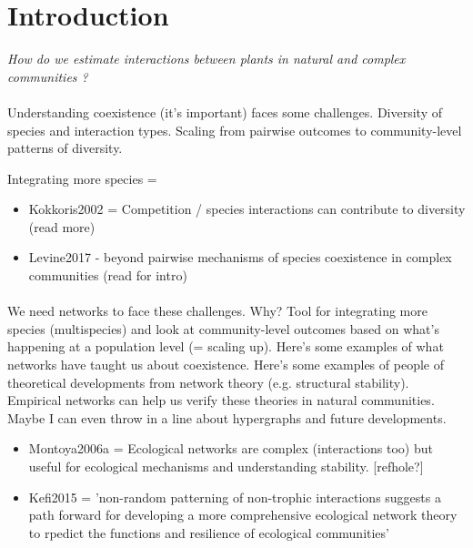 \documentclass[a4,12pt]{article}
\begin{document}
    


    \section{Introduction}

    \textit{How do we estimate interactions between plants in natural and complex communities ?}
 
    \paragraph{}
    Understanding coexistence (it's important) faces some challenges. Diversity of species and interaction types. Scaling from pairwise outcomes to community-level patterns of diversity.
    
    Integrating more species = 
    \begin{itemize}
        \item Kokkoris2002 =  Competition / species interactions can contribute to diversity (read more)
        \item Levine2017 - beyond pairwise mechanisms of species coexistence in complex communities (read for intro)
    \end{itemize}

    \paragraph{}
    We need networks to face these challenges. Why? Tool for integrating more species (multispecies) and look at community-level outcomes based on what's happening at a population level (= scaling up). Here's some examples of what networks have taught us about coexistence. Here's some examples of people of theoretical developments from network theory (e.g. structural stability). Empirical networks can help us verify these theories in natural communities. Maybe I can even throw in a line about hypergraphs and future developments.
    \begin{itemize}
        \item  Montoya2006a = Ecological networks are complex (interactions too) but useful for ecological mechanisms and understanding stability. [refhole?]
        \item Kefi2015 = 'non-random patterning of non-trophic interactions suggests a path forward for developing a more comprehensive ecological network theory to rpedict the functions and resilience of ecological communities'
    \end{itemize}
\end{document}
